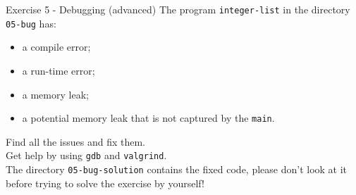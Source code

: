 \documentclass[10pt]{beamer}
\begin{document}
\begin{frame}{Exercise 5 - Debugging (advanced)}
The program \texttt{integer-list} in the directory \texttt{05-bug} has:

\begin{itemize}
    \item a compile error;
    \item a run-time error;
    \item a memory leak;
    \item a potential memory leak that is not captured by the \texttt{main}.
\end{itemize}
\vspace{0.5cm}
Find all the issues and fix them. \\[3mm]

Get help by using \texttt{gdb} and \texttt{valgrind}.\\[3mm]

The directory \texttt{05-bug-solution} contains the fixed code,
please don't look at it before trying to solve the exercise by yourself!
\end{frame}
\end{document}
